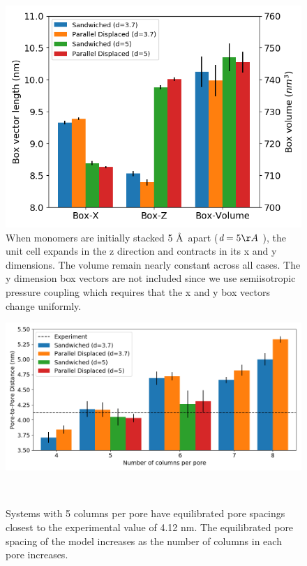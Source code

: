 \documentclass[journal=jpcbfk,manusciprt=article]{achemso}
\begin{document}
  \begin{figure}[htb]
  \centering
  \includegraphics[width=\textwidth]{box_dimensions.png}
  \caption{When monomers are initially stacked 5 \AA~apart ($\textit{d}=5 \AA~$), the unit cell
  expands in the z direction and contracts in its x and y dimensions. The volume remain nearly
  constant across all cases. The y dimension box vectors are not included since we use 
  semiisotropic pressure coupling which requires that the x and y box vectors change uniformly.}\label{fig:box_dimensions}
  \end{figure}  

  \begin{figure}
	\centering
	\includegraphics[width=\linewidth]{p2p.png}
	\caption{Systems with 5 columns per pore have equilibrated pore spacings closest to
			 the experimental value of 4.12 nm. The equilibrated pore spacing of the model 	
			 increases as the number of columns in each pore increases.}~\label{fig:p2p}
  \end{figure}  
\end{document}
